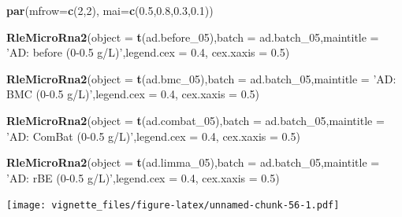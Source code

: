 \documentclass[]{book}
\newenvironment{Shaded}{\begin{snugshade}}{\end{snugshade}}
\newcommand{\KeywordTok}[1]{\textcolor[rgb]{0.13,0.29,0.53}{\textbf{#1}}}
\newcommand{\DataTypeTok}[1]{\textcolor[rgb]{0.13,0.29,0.53}{#1}}
\newcommand{\DecValTok}[1]{\textcolor[rgb]{0.00,0.00,0.81}{#1}}
\newcommand{\FloatTok}[1]{\textcolor[rgb]{0.00,0.00,0.81}{#1}}
\newcommand{\StringTok}[1]{\textcolor[rgb]{0.31,0.60,0.02}{#1}}
\newcommand{\NormalTok}[1]{#1}
\begin{document}
\begin{Shaded}
\begin{Highlighting}[]
\KeywordTok{par}\NormalTok{(}\DataTypeTok{mfrow=}\KeywordTok{c}\NormalTok{(}\DecValTok{2}\NormalTok{,}\DecValTok{2}\NormalTok{), }\DataTypeTok{mai=}\KeywordTok{c}\NormalTok{(}\FloatTok{0.5}\NormalTok{,}\FloatTok{0.8}\NormalTok{,}\FloatTok{0.3}\NormalTok{,}\FloatTok{0.1}\NormalTok{))}

\KeywordTok{RleMicroRna2}\NormalTok{(}\DataTypeTok{object =} \KeywordTok{t}\NormalTok{(ad.before_}\DecValTok{05}\NormalTok{),}\DataTypeTok{batch =}\NormalTok{ ad.batch_}\DecValTok{05}\NormalTok{,}\DataTypeTok{maintitle =} \StringTok{'AD: before (0-0.5 g/L)'}\NormalTok{,}\DataTypeTok{legend.cex =} \FloatTok{0.4}\NormalTok{, }\DataTypeTok{cex.xaxis =} \FloatTok{0.5}\NormalTok{)}

\KeywordTok{RleMicroRna2}\NormalTok{(}\DataTypeTok{object =} \KeywordTok{t}\NormalTok{(ad.bmc_}\DecValTok{05}\NormalTok{),}\DataTypeTok{batch =}\NormalTok{ ad.batch_}\DecValTok{05}\NormalTok{,}\DataTypeTok{maintitle =} \StringTok{'AD: BMC (0-0.5 g/L)'}\NormalTok{,}\DataTypeTok{legend.cex =} \FloatTok{0.4}\NormalTok{, }\DataTypeTok{cex.xaxis =} \FloatTok{0.5}\NormalTok{)}

\KeywordTok{RleMicroRna2}\NormalTok{(}\DataTypeTok{object =} \KeywordTok{t}\NormalTok{(ad.combat_}\DecValTok{05}\NormalTok{),}\DataTypeTok{batch =}\NormalTok{ ad.batch_}\DecValTok{05}\NormalTok{,}\DataTypeTok{maintitle =} \StringTok{'AD: ComBat (0-0.5 g/L)'}\NormalTok{,}\DataTypeTok{legend.cex =} \FloatTok{0.4}\NormalTok{, }\DataTypeTok{cex.xaxis =} \FloatTok{0.5}\NormalTok{)}

\KeywordTok{RleMicroRna2}\NormalTok{(}\DataTypeTok{object =} \KeywordTok{t}\NormalTok{(ad.limma_}\DecValTok{05}\NormalTok{),}\DataTypeTok{batch =}\NormalTok{ ad.batch_}\DecValTok{05}\NormalTok{,}\DataTypeTok{maintitle =} \StringTok{'AD: rBE (0-0.5 g/L)'}\NormalTok{,}\DataTypeTok{legend.cex =} \FloatTok{0.4}\NormalTok{, }\DataTypeTok{cex.xaxis =} \FloatTok{0.5}\NormalTok{)}
\end{Highlighting}
\end{Shaded}

\texttt{[image: vignette\_files/figure-latex/unnamed-chunk-56-1.pdf]}
\end{document}

